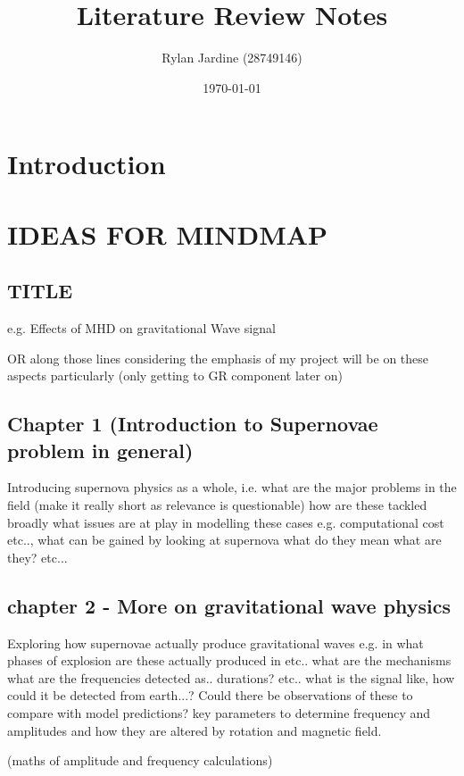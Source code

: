 \documentclass{article}
\title{\textbf{Literature Review Notes}}
\author{Rylan Jardine (28749146)}
\date{\today}
\begin{document}
\maketitle
\section{Introduction}

\section{IDEAS FOR MINDMAP}


\subsection{TITLE}

e.g. Effects of MHD on gravitational Wave signal 

OR along those lines considering the emphasis of my project will be on these aspects particularly (only getting to GR component later on)


\subsection{Chapter 1 (Introduction to Supernovae problem in general)}

Introducing supernova physics as a whole, i.e. what are the major problems in the field (make it really short as relevance is questionable) how are these tackled broadly what issues are at play in modelling these cases e.g. computational cost etc.., what can be gained by looking at supernova what do they mean what are they? etc...

\subsection{chapter 2 - More on gravitational wave physics}

Exploring how supernovae actually produce gravitational waves e.g. in what phases of explosion are these actually produced in etc.. what are the mechanisms what are the frequencies detected as.. durations? etc.. what is the signal like, how could it be detected from earth...? Could there be observations of these to compare with model predictions? key parameters to determine frequency and amplitudes and how they are altered by rotation and magnetic field. 

(maths of amplitude and frequency calculations) 
\end{document}
